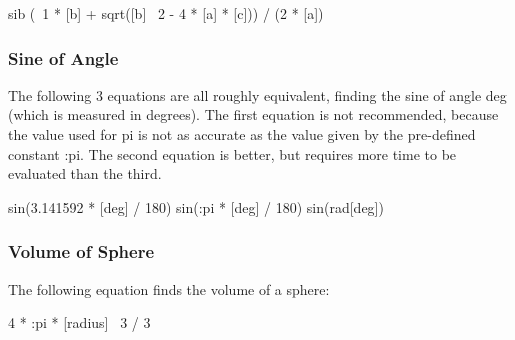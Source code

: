 \begin{vcode}{sib}
(~1 * [b] + sqrt([b] \circflex\ 2 - 4 * [a] * [c])) / (2 * [a]) 
\end{vcode}

\subsubsection{Sine of Angle}

The following 3 equations are all roughly equivalent, finding the sine
of angle deg (which is measured in degrees). The first equation is not
recommended, because the value used for pi is not as accurate as the
value given by the pre-defined constant :pi. The second equation is
better, but requires more time to be evaluated than the third.

\begin{example}
sin(3.141592 * [deg] / 180)
sin(:pi * [deg] / 180)
sin(rad[deg]) 
\end{example}

\subsubsection{Volume of Sphere}

The following equation finds the volume of a sphere: 

\begin{example}
4 * :pi * [radius] \circflex\ 3 / 3 
\end{example}

